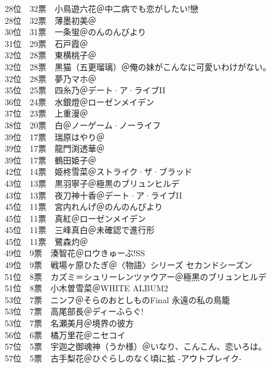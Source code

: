 {    28位　32票　小鳥遊六花＠中二病でも恋がしたい!戀\\
    28位　32票　薄墨初美＠\Saki\\
    30位　31票　一条蛍＠のんのんびより\\
    31位　29票　石戸霞＠\Saki\\
    32位　28票　東横桃子＠\Saki\\
    32位　28票　黒猫（五更瑠璃）＠俺の妹がこんなに可愛いわけがない。\\
    32位　28票　夢乃マホ＠\Saki\\
    35位　25票　四糸乃＠デート·ア·ライブII\\
    36位　24票　水銀燈＠ローゼンメイデン\\
    37位　23票　上重漫＠\Saki\\
    38位　20票　白＠ノーゲーム·ノーライフ\\
    39位　17票　瑞原はやり＠\Saki\\
    39位　17票　龍門渕透華＠\Saki\\
    39位　17票　鶴田姫子＠\Saki\\
    42位　14票　姫柊雪菜＠ストライク·ザ·ブラッド\\
    43位　13票　黒羽寧子＠極黒のブリュンヒルデ\\
    43位　13票　夜刀神十香＠デート·ア·ライブII\\
    45位　11票　宮内れんげ＠のんのんびより\\
    45位　11票　真紅＠ローゼンメイデン\\
    45位　11票　三峰真白＠未確認で進行形\\
    45位　11票　鷺森灼＠\Saki\\
    49位　9票　湊智花＠ロウきゅーぶ!SS\\
    49位　9票　戦場ヶ原ひたぎ＠〈物語〉シリーズ セカンドシーズン\\
    51位　8票　カズミ＝シュリーレンツァウアー＠極黒のブリュンヒルデ\\
    51位　8票　小木曽雪菜＠WHITE ALBUM2\\
    53位　7票　ニンフ＠そらのおとしものFinal 永遠の私の鳥籠\\
    53位　7票　高尾部長＠ディーふらぐ!\\
    53位　7票　名瀬美月＠境界の彼方\\
    56位　6票　橘万里花＠ニセコイ\\
    57位　5票　宇迦之御魂神（うか様）＠いなり、こんこん、恋いろは。\\
    57位　5票　古手梨花＠ひぐらしのなく頃に拡 -アウトブレイク-\\
}
